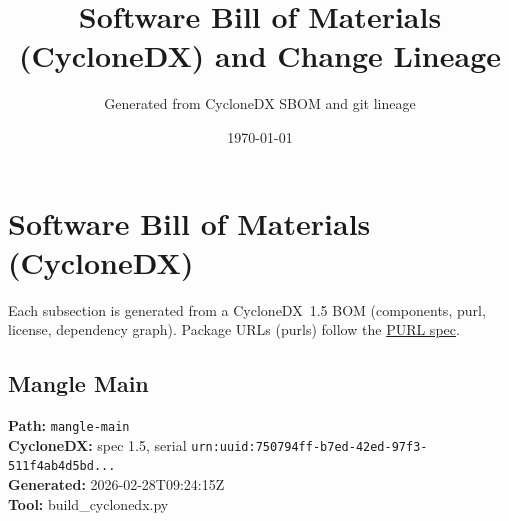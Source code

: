 \documentclass[11pt,a4paper]{article}
\title{\textbf{Software Bill of Materials (CycloneDX) and Change Lineage}}
\author{Generated from CycloneDX SBOM and git lineage}
\date{\today}
\begin{document}
\maketitle
\tableofcontents
\newpage
\section{Software Bill of Materials (CycloneDX)}
Each subsection is generated from a CycloneDX~1.5 BOM (components, purl, license, dependency graph). Package URLs (purls) follow the \href{https://github.com/package-url/purl-spec}{PURL spec}.

\subsection{Mangle Main}
\textbf{Path:} \texttt{mangle-main}
\\ \textbf{CycloneDX:} spec 1.5, serial \texttt{urn:uuid:750794ff-b7ed-42ed-97f3-511f4ab4d5bd...}
\\ \textbf{Generated:} 2026-02-28T09:24:15Z
\\ \textbf{Tool:} build\_cyclonedx.py
\end{document}
